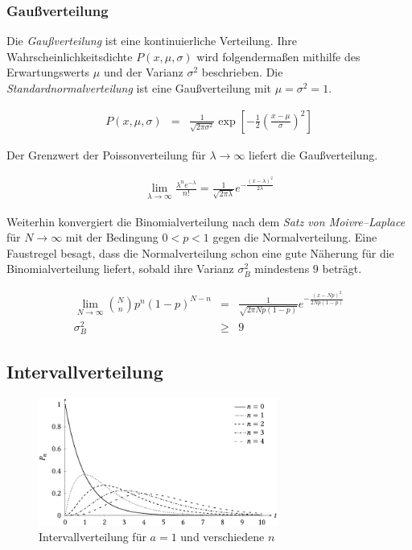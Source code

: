 \documentclass[12pt,a4paper]{scrartcl}
\numberwithin{equation}{section} %
\begin{document}
\subsubsection{Gaußverteilung}
\label{Gaußverteilung}
Die \emph{Gaußverteilung} ist eine kontinuierliche Verteilung. Ihre Wahrscheinlichkeitsdichte $P(x,\mu,\sigma)$ wird folgendermaßen mithilfe des Erwartungswerts $\mu$ und der Varianz $\sigma^2$ beschrieben. Die \emph{Standardnormalverteilung}  ist eine Gaußverteilung mit $\mu=\sigma^2=1$.

\begin{eqnarray}
	P(x,\mu,\sigma) &=& \frac{1}{\sqrt{2 \pi\sigma^2}} \exp\left[- \frac{1}{2} \left(\frac{x - \mu}{\sigma}\right)^2\right]
\end{eqnarray}

\noindent
Der Grenzwert der Poissonverteilung für $\lambda \rightarrow \infty$ liefert die Gaußverteilung.

\begin{eqnarray}
	\lim_{\lambda \rightarrow \infty} \frac{\lambda^n e^{-\lambda}}{n!} = \frac{1}{\sqrt{2 \pi \lambda}} e^{- \frac{(x-\lambda)^2}{2\lambda}}
\end{eqnarray}

\noindent
Weiterhin konvergiert die Binomialverteilung nach dem \emph{Satz von Moivre--Laplace} für $N \rightarrow \infty$ mit der Bedingung $0 < p < 1$ gegen die Normalverteilung. Eine Faustregel besagt, dass die Normalverteilung schon eine gute Näherung für die Binomialverteilung liefert, sobald ihre Varianz $\sigma^2_B$ mindestens $9$ beträgt.

\begin{eqnarray}
	\lim_{N \rightarrow \infty} \binom{N}{n} p^n (1-p)^{N-n}
		&=& \frac{1}{\sqrt{2 \pi N p (1-p)}} e^{- \frac{(x - Np)^2}{2 N p (1-p)}} \\
	\sigma^2_B &\geq& 9
\end{eqnarray}

\hypertarget{Intervallverteilung}{\subsection{Intervallverteilung}\label{Intervallverteilung}}
\begin{figure}[h!]
	\centering
	\includegraphics[width=0.7\textwidth]{../media/B3.1/Intervallverteilungen.pdf}
	\caption{Intervallverteilung für $a = 1$ und verschiedene $n$ \cite{uni}}
	\label{fig:Intervallverteilung}
\end{figure}
\end{document}
